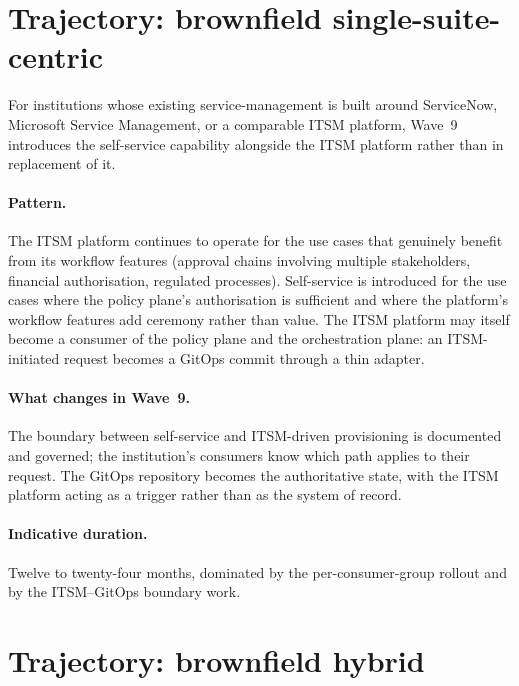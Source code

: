 \section{Trajectory: brownfield single-suite-centric}
\label{sec:w9-brownfield-ms}

For institutions whose existing service-management is built
around ServiceNow, Microsoft Service Management, or a
comparable ITSM platform, Wave~9 introduces the self-service
capability alongside the ITSM platform rather than in
replacement of it.

\paragraph{Pattern.} The ITSM platform continues to operate for
the use cases that genuinely benefit from its workflow features
(approval chains involving multiple stakeholders, financial
authorisation, regulated processes). Self-service is introduced
for the use cases where the policy plane's authorisation is
sufficient and where the platform's workflow features add
ceremony rather than value. The ITSM platform may itself become
a consumer of the policy plane and the orchestration plane: an
ITSM-initiated request becomes a GitOps commit through a thin
adapter.

\paragraph{What changes in Wave~9.} The boundary between
self-service and ITSM-driven provisioning is documented and
governed; the institution's consumers know which path applies
to their request. The GitOps repository becomes the
authoritative state, with the ITSM platform acting as a
trigger rather than as the system of record.

\paragraph{Indicative duration.} Twelve to twenty-four months,
dominated by the per-consumer-group rollout and by the
ITSM--GitOps boundary work.

\section{Trajectory: brownfield hybrid}
\label{sec:w9-brownfield-hybrid}

